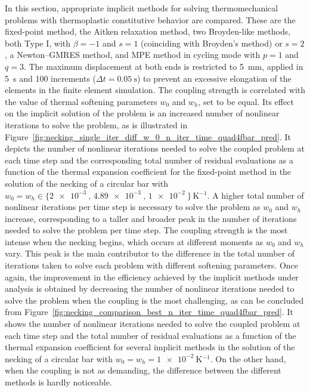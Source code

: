      In this section, appropriate implicit methods for solving thermomechanical problems with thermoplastic constitutive behavior are compared.
     These are the fixed-point method, the Aitken relaxation method, two Broyden-like methods, both Type I, with $\beta=-1$ and $s=1$ (coinciding with Broyden's method) or $s=2$, a Newton–GMRES method, and MPE method in cycling mode with $p=1$ and $q=3$.
     The maximum displacement at both ends is restricted to \SI{5}{\milli\meter}, applied in \SI{5}{\second} and 100 increments (\(\Delta t = \SI{0.05}{\second}\)) to prevent an excessive elongation of the elements in the finite element simulation.
     The coupling strength is correlated with the value of thermal softening parameters \(w_0\) and \(w_h\), set to be equal.
     Its effect on the implicit solution of the problem is an increased number of nonlinear iterations to solve the problem, as is illustrated in Figure~\ref{fig:necking_single_iter_diff_w_0_n_iter_time_quad4fbar_pred}.
     It depicts the number of nonlinear iterations needed to solve the coupled problem at each time step and the corresponding total number of residual evaluations as a function of the thermal expansion coefficient for the fixed-point method in the solution of the necking of a circular bar with \(w_0=w_h\in\{\SI{2e-3}{},\, \SI{4.89e-3}{},\, \SI{1e-2}{}\}\,\si{\kelvin^{-1}}\).
     A higher total number of nonlinear iterations per time step is necessary to solve the problem as \(w_0\) and \(w_h\) increase, corresponding to a taller and broader peak in the number of iterations needed to solve the problem per time step.
     The coupling strength is the most intense when the necking begins, which occurs at different moments as \(w_0\) and \(w_h\) vary.
     This peak is the main contributor to the difference in the total number of iterations taken to solve each problem with different softening parameters.
     Once again, the improvement in the efficiency achieved by the implicit methods under analysis is obtained by decreasing the number of nonlinear iterations needed to solve the problem when the coupling is the most challenging, as can be concluded from Figure~\ref{fig:necking_comparison_best_n_iter_time_quad4fbar_pred}.
     It shows the number of nonlinear iterations needed to solve the coupled problem at each time step and the total number of residual evaluations as a function of the thermal expansion coefficient for several implicit methods in the solution of the necking of a circular bar with \(w_0=w_h=\SI{1e-2}{\kelvin^{-1}}\).
     On the other hand, when the coupling is not as demanding, the difference between the different methods is hardly noticeable.

